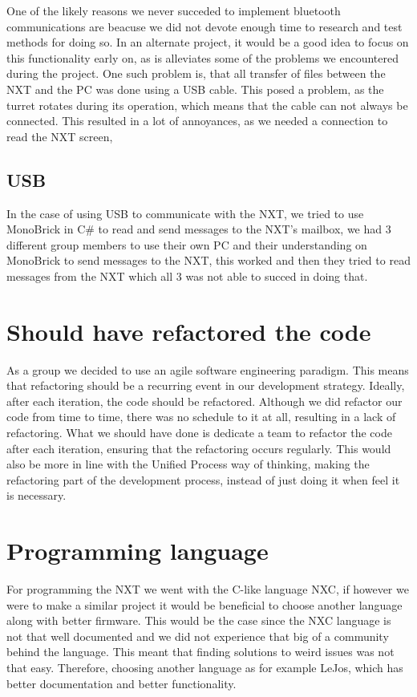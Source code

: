 One of the likely reasons we never succeded to implement bluetooth
communications are beacuse we did not devote enough time to research and test
methods for doing so. In an alternate project, it would be a good idea to focus
on this functionality early on, as is alleviates some of the problems we
encountered during the project. One such problem is, that all transfer of files
between the NXT and the PC was done using a USB cable. This posed a problem, as
the turret rotates during its operation, which means that the cable can not
always be connected. This resulted in a lot of annoyances, as we needed a
connection to read the NXT screen, 


\subsection{USB}
In the case of using USB to communicate with the NXT, we tried to use MonoBrick
\cite{MonoBrick} in C\# to read and send messages to the NXT's mailbox, we had 3
different group members to use their own PC and their understanding on MonoBrick
to send messages to the NXT, this worked and then they tried to read messages
from the NXT which all 3 was not able to succed in doing that. 
 


\section{Should have refactored the code}
As a group we decided to use an agile software engineering paradigm. This means that
refactoring should be a recurring event in our development strategy. Ideally, after each iteration, the code should be refactored. Although we did refactor our code from time to time, there was no schedule to it at all, resulting in a lack of refactoring. What we should have done is dedicate a team to refactor the code after each iteration, ensuring that the refactoring occurs regularly. This would also be more in line with the Unified Process way of thinking, making the refactoring part of the development process, instead of just doing it when feel it is necessary.

\section{Programming language}
For programming the NXT we went with the C-like language NXC, if however we were
to make a similar project it would be beneficial to choose another language
along with better firmware. This would be the case since the NXC language is not
that well documented and we did not experience that big of a community behind
the language. This meant that finding solutions to weird issues was not that
easy. Therefore, choosing another language as for example LeJos, which has
better documentation and better functionality. \nl

